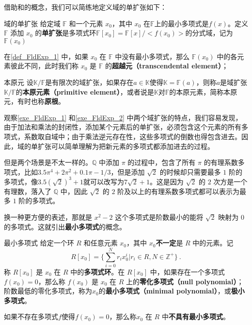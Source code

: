 借助和的概念，我们可以简练地定义域的单扩张如下：


\begin{definition}{域的单扩张}\label{def_FldExp_1}
给定域 $\mathbb{F}$ 和一个元素 $x_0$，其中 $x_0$ 在$\mathbb{F}$上的最小多项式是$f(x)$。定义 $\mathbb{F}$ 添加 $x_0$ 的\textbf{单扩张}是多项式环$\mathbb{F}[x_0]=\mathbb{F}[x]/<f(x_0)>$的分式域，记为$\mathbb{F}(x_0)$
\end{definition}

在\autoref{def_FldExp_1} 中，如果 $x_0$ 在 $\mathbb{F}$ 中没有最小多项式，那么 $\mathbb{F}(x_0)$ 中的各元素彼此不同，此时我们称 $x_0$ 是 $\mathbb{F}$ 的\textbf{超越元（transcendental element）}；

\begin{definition}{本原元}\label{def_FldExp_7}
设$\mathbb{K}/\mathbb{F}$是有限次的域扩张，如果存在$a\in\mathbb{K}$使得$\mathbb{K}=\mathbb{F}(a)$，则称$a$是域扩张$\mathbb{K}/\mathbb{F}$的\textbf{本原元素（primitive element）}，或者说是$\mathbb{K}$对$\mathbb{F}$的本原元素，简称本原元，有时也称\textbf{原根}。
\end{definition}

观察\autoref{exe_FldExp_1} 和\autoref{exe_FldExp_2} 中两个域扩张的特点，我们容易发现，由于加法和乘法的封闭性，添加某个元素后的单扩张，必须包含这个元素的所有多项式，系数取自域中；由于乘法逆元存在性，这些多项式的倒数也得包含进去。因此，域的单扩张可以简单理解为把新元素的多项式都添加进去的过程。

但是两个场景是不太一样的。$\mathbb{Q}$ 中添加 $\pi$ 的过程中，包含了所有 $\pi$ 的有理系数多项式，比如$3.5\pi^4+2\pi^2+0.1\pi-1/3$，但是添加 $\sqrt{2}$ 的时候却只需要最多 $1$ 阶的多项式，像$3.5(\sqrt{2})^3+1$就可以改写为$7\sqrt{2}+1$。这是因为 $\sqrt{2}$ 的 $2$ 次方是一个有理数，落入了 $\mathbb{Q}$ 中，因此 $\sqrt{2}$ 的 $2$ 阶及以上的有理系数多项式都可以表示为最多 $1$ 阶的多项式。

换一种更方便的表述，那就是 $x^2-2$ 这个多项式是阶数最小的能将 $\sqrt{2}$ 映射为 $0$ 的多项式。这就引出\textbf{最小多项式}的概念。

\begin{definition}{最小多项式}
给定一个环 $R$ 和任意元素 $x_0$，其中 $x_0$\textbf{不一定}是 $R$ 中的元素。记
$$R[x_0]=\{\sum_{i=0}^N r_ix_0^i|r_i\in R, N\in\mathbb{Z}^+\}~.$$称 $R[x_0]$ 是 $x_0$ 在 $R$ 中的\textbf{多项式环}。在 $R[x_0]$ 中，如果存在一个多项式 $f(x_0)=0$，那么称 $f(x_0)$ 是 $x_0$ 在 $R$ 上的\textbf{零化多项式（null polynomial）}；阶数最低的零化多项式，称为$x_0$的\textbf{最小多项式（minimal polynomial）}，或\textbf{极小多项式}。

如果不存在多项式$f$使得$f(x_0)=0$，那么称$x_0$ 在 $R$ 中\textbf{不具有最小多项式}。
\end{definition}


